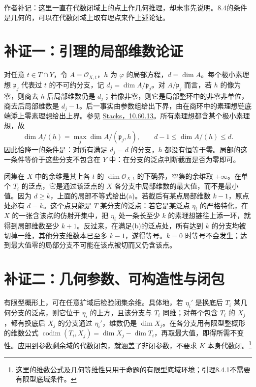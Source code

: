 \documentclass[openany,fontset=fandol]{ctexbook}
\DeclareMathOperator{\codim}{codim}
\newcommand{\OO}{\mathcal O}
\begin{document}
作者补记：这里一直在代数闭域上的点上作几何推理，却未事先说明。8.4的条件是几何的，可以在代数闭域上取有理点来作上述论证。

\newpage
\section*{补证一：引理的局部维数论证}
对任意 $t\in T\cap Y$，令 $A=\OO_{X,t}$，$h$ 为 $\varphi$ 的局部方程，$d=\dim A$。每个极小素理想 $\mathfrak p_j$ 代表过 $t$ 的不可约分支，记 $d_j=\dim A/\mathfrak p_j$。对 $A/\mathfrak p_j$ 而言，若 $h$ 的像为零，则商去 $h$ 后局部维数仍是 $d_j$；若像非零，则它是局部整环中的非零非单位，商去后局部维数是 $d_j-1$。后一事实由参数组给出下界，由在商环中的素理想链底端添上零素理想给出上界。参见 \href{https://stacks.math.columbia.edu/tag/00KW}{Stacks，10.60.13}。所有素理想都含某个极小素理想，故
\[
 \dim A/(h)=\max_j\dim A/(\mathfrak p_j,h),\qquad
 d-1\le \dim A/(h)\le d.
\]
因此恰降一的条件是：对所有满足 $d_j=d$ 的分支，$h$ 都没有恒等于零。局部的这一条件等价于这些分支不包含在 $Y$ 中：在分支的泛点判断截面是否为零即可。

闭集在 $X$ 中的余维是其上各 $t$ 的 $\dim\OO_{X,t}$ 的下确界，空集的余维取 $+\infty$。在单个 $T_i$ 的泛点，它是通过该泛点的 $X$ 各分支中局部维数的最大值，而不是最小值。因为 $d\ge k$，上面的局部不等式给出(a)。若截后有某点局部维数 $k-1$，原点处必有 $d=k$。这个点只能是 $T$ 某分支的泛点：若它是某泛点 $\eta_i$ 的严格特化，在 $X$ 的一张含该点的仿射开集中，把 $\eta_i$ 处一条长至少 $k$ 的素理想链往上添一环，就得到局部维数至少 $k+1$。反过来，在满足(b)的泛点处，所有达到 $k$ 的分支均被切掉一维，其他分支维数本已至多 $k-1$，遂得等号。$k=0$ 时等号不会发生；达到最大值零的局部分支不可能在该点被切而又仍含该点。

\newpage
\section*{补证二：几何参数、可构造性与闭包}
有限型概形上，可在任意扩域后检验闭集余维。具体地，若 $\eta_i'$ 是换底后 $T_i$ 某几何分支的泛点，则它位于 $\eta_i$ 的上方，且该分支与 $T_i$ 同维；对每个包含 $T_i$ 的 $X_j$，都有换底后 $X_j$ 的分支通过 $\eta_i'$，维数仍是 $\dim X_j$。在各分支用有限型整概形的维数公式 $\codim(T_i,X_j)=\dim X_j-\dim T_i$，再取最大值，即得所需不变性。应用到参数剩余域的代数闭包，就涵盖了非闭参数，不要求 $K$ 本身代数闭。\footnote{这里的维数公式及几何等维性只用于命题的有限型底域环境；引理8.4.1不需要有限型底域条件。}
\end{document}
